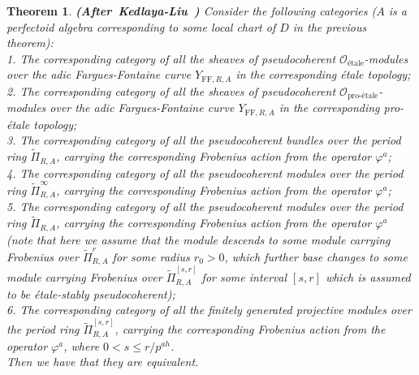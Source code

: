\documentclass[12pt]{amsart}
\newtheorem{theorem}{Theorem}[section]
\theoremstyle{definition}
\numberwithin{equation}{section}
\begin{document}
\begin{theorem} \mbox{\bf{(After Kedlaya-Liu \cite[Theorem 4.6.1]{KL2})}}  \label{theorem3.11}
Consider the following categories ($A$ is a perfectoid algebra corresponding to some local chart of $D$ in the previous theorem):\\
1. The corresponding category of all the sheaves of pseudocoherent $\mathcal{O}_{\text{\'etale}}$-modules over the adic Fargues-Fontaine curve $Y_{\mathrm{FF},R,A}$ in the corresponding \'etale topology;\\
2. The corresponding category of all the sheaves of pseudocoherent $\mathcal{O}_{\text{pro-\'etale}}$-modules over the adic Fargues-Fontaine curve $Y_{\mathrm{FF},R,A}$ in the corresponding pro-\'etale topology;\\
3. The corresponding category of all the pseudocoherent bundles over the period ring $\widetilde{\Pi}_{R,A}$, carrying the corresponding Frobenius action from the operator $\varphi^a$;\\
4. The corresponding category of all the pseudocoherent modules over the period ring $\widetilde{\Pi}^{\infty}_{R,A}$, carrying the corresponding Frobenius action from the operator $\varphi^a$;\\
5. The corresponding category of all the pseudocoherent modules over the period ring $\widetilde{\Pi}^{}_{R,A}$, carrying the corresponding Frobenius action from the operator $\varphi^a$ (note that here we assume that the module descends to some module carrying Frobenius over $\widetilde{\Pi}^{r}_{R,A}$ for some radius $r_0>0$, which further base changes to some module carrying Frobenius over $\widetilde{\Pi}^{[s,r]}_{R,A}$ for some interval $[s,r]$ which is assumed to be \'etale-stably pseudocoherent);\\
6. The corresponding category of all the finitely generated projective modules over the period ring $\widetilde{\Pi}^{[s,r]}_{R,A}$, carrying the corresponding Frobenius action from the operator $\varphi^a$, where $0<s\leq r/p^{ah}$.\\
Then we have that they are equivalent.
\end{theorem}
\end{document}
